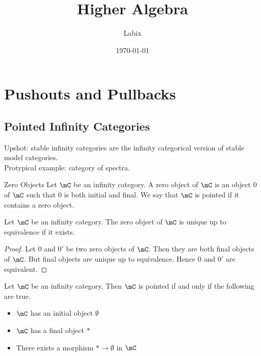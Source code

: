 \documentclass[a4paper]{article}
\title{Higher Algebra}
\author{Labix}
\date{\today}
\begin{document}
\maketitle
\begin{abstract}
\begin{itemize}
\end{itemize}
\end{abstract}
\pagebreak
\tableofcontents

\pagebreak
\section{Pushouts and Pullbacks}
\subsection{Pointed Infinity Categories}
Upshot: stable infinity categories are the infinity categorical version of stable model categories. \\
Protypical example: category of spectra. 

\begin{defn}{Zero Objects}{} Let $\mC$ be an infinity category. A zero object of $\mC$ is an object $0$ of $\mC$ such that $0$ is both initial and final. We say that $\mC$ is pointed if it contains a zero object. 
\end{defn}

\begin{lmm}{}{} Let $\mC$ be an infinity category. The zero object of $\mC$ is unique up to equivalence if it exists. \tcbline
\begin{proof}
Let $0$ and $0'$ be two zero objects of $\mC$. Then they are both final objects of $\mC$. But final objects are unique up to equivalence. Hence $0$ and $0'$ are equivalent. 
\end{proof}
\end{lmm}

\begin{lmm}{}{} Let $\mC$ be an infinity category. Then $\mC$ is pointed if and only if the following are true. 
\begin{itemize}
\item $\mC$ has an initial object $\emptyset$
\item $\mC$ has a final object $\ast$
\item There exists a morphism $\ast\to\emptyset$ in $\mC$
\end{itemize}
\end{lmm}
\end{document}
